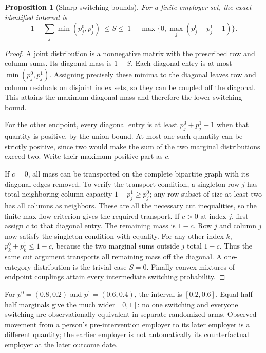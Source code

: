 \documentclass[11pt]{article}
\newtheorem{proposition}{Proposition}
\begin{document}
\begin{proposition}[Sharp switching bounds]
For a finite employer set, the exact identified interval is
\[
 1-\sum_j\min(p_j^0,p_j^1)
 \ \leq S\leq\
 1-\max\{0,\max_j(p_j^0+p_j^1-1)\}.
\]
\end{proposition}
\begin{proof}
A joint distribution is a nonnegative matrix with the prescribed row and column sums. Its diagonal mass is $1-S$. Each diagonal entry is at most $\min(p_j^0,p_j^1)$. Assigning precisely these minima to the diagonal leaves row and column residuals on disjoint index sets, so they can be coupled off the diagonal. This attains the maximum diagonal mass and therefore the lower switching bound.

For the other endpoint, every diagonal entry is at least $p_j^0+p_j^1-1$ when that quantity is positive, by the union bound. At most one such quantity can be strictly positive, since two would make the sum of the two marginal distributions exceed two. Write their maximum positive part as $c$.

If $c=0$, all mass can be transported on the complete bipartite graph with its diagonal edges removed. To verify the transport condition, a singleton row $j$ has total neighboring column capacity $1-p_j^1\geq p_j^0$; any row subset of size at least two has all columns as neighbors. These are all the necessary cut inequalities, so the finite max-flow criterion gives the required transport. If $c>0$ at index $j$, first assign $c$ to that diagonal entry. The remaining mass is $1-c$. Row $j$ and column $j$ now satisfy the singleton condition with equality. For any other index $k$, $p_k^0+p_k^1\leq1-c$, because the two marginal sums outside $j$ total $1-c$. Thus the same cut argument transports all remaining mass off the diagonal. A one-category distribution is the trivial case $S=0$. Finally convex mixtures of endpoint couplings attain every intermediate switching probability.
\end{proof}

For $p^0=(0.8,0.2)$ and $p^1=(0.6,0.4)$, the interval is $[0.2,0.6]$. Equal half-half marginals give the much wider $[0,1]$: no one switching and everyone switching are observationally equivalent in separate randomized arms. Observed movement from a person's pre-intervention employer to its later employer is a different quantity; the earlier employer is not automatically its counterfactual employer at the later outcome date.
\end{document}
